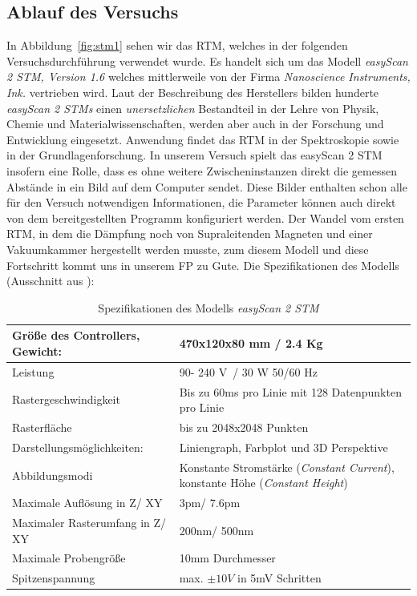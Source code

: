 \subsection{Ablauf des Versuchs}
In Abbildung~\ref{fig:stm1} sehen wir das RTM, welches in der
folgenden Versuchsdurchführung verwendet wurde. Es handelt sich
um das Modell \textit{easyScan 2 STM, Version 1.6} welches 
mittlerweile von 
der Firma \textit{Nanoscience Instruments, Ink.} vertrieben wird.
Laut der Beschreibung des Herstellers  
bilden hunderte \textit{easyScan 2 STMs} einen
\textit{unersetzlichen} Bestandteil in der Lehre von Physik,
Chemie und Materialwissenschaften, werden aber auch in der
Forschung und Entwicklung eingesetzt. Anwendung findet das RTM
in der Spektroskopie sowie in der Grundlagenforschung.
In unserem Versuch spielt das easyScan 2 STM insofern eine Rolle,
dass es ohne weitere Zwischeninstanzen direkt die gemessen
Abstände in ein Bild auf dem Computer sendet. Diese Bilder
enthalten schon alle für den Versuch notwendigen Informationen,
die Parameter können auch direkt von dem bereitgestellten Programm
konfiguriert werden. Der Wandel vom ersten RTM, in dem die Dämpfung
noch von Supraleitenden Magneten und einer Vakuumkammer hergestellt
werden musste, zum diesem Modell und diese Fortschritt kommt uns
in unserem FP zu Gute. Die Spezifikationen des Modells 
(Ausschnitt aus \cite{easyscan2_STM}):\\
\begin{table}[h]
\begin{tabular}{| l | p{7cm} |}
\hline
  Größe des Controllers, Gewicht: & 470x120x80 mm / 2.4 Kg\\ \hline
  Leistung & 90- 240 V~/ 30 W 50/60 Hz \\ \hline
  Rastergeschwindigkeit & Bis zu 60ms pro Linie mit 128 Datenpunkten  pro Linie \\ \hline
Rasterfläche & bis zu 2048x2048 Punkten \\ \hline 
Darstellungsmöglichkeiten: & Liniengraph, Farbplot und 3D Perspektive \\ \hline
Abbildungsmodi & Konstante Stromstärke (\textit{Constant Current}),
konstante Höhe (\textit{Constant Height}) \\ \hline
Maximale Auflösung in Z/ XY & 3pm/ 7.6pm \\ \hline
Maximaler Rasterumfang in Z/ XY & 200nm/ 500nm  \\ \hline
Maximale Probengröße & 10mm Durchmesser \\ \hline
Spitzenspannung & max. $\pm 10V$ in 5mV Schritten \\ \hline
\end{tabular}
\caption{Spezifikationen des Modells \textit{easyScan 2 STM} \cite{easyscan2_STM}}
\label{tab:STM}
\end{table}


